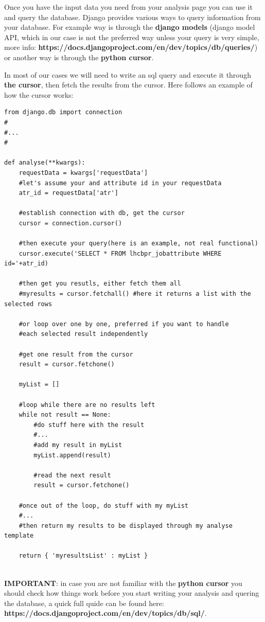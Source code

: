 \documentclass{lhcbnote}
\begin{document}
Once you have the input data you need from your analysis page you can use it and query the database. Django provides various ways to query information from your database. For example way is through the {\bf django models} (django model API, which in our case is not the preferred way unless your query is very simple, more info: {\bf https://docs.djangoproject.com/en/dev/topics/db/queries/}) or another way is through the {\bf python cursor}.

In most of our cases we will need to write an sql query and execute it through {\bf the cursor}, then fetch the results from the cursor. Here follows an example of how the cursor works:

\begin{verbatim}
from django.db import connection
#
#...
#

def analyse(**kwargs):
    requestData = kwargs['requestData']
    #let's assume your and attribute id in your requestData
    atr_id = requestData['atr']
    
    #establish connection with db, get the cursor
    cursor = connection.cursor()
    
    #then execute your query(here is an example, not real functional)
    cursor.execute('SELECT * FROM lhcbpr_jobattribute WHERE id='+atr_id)
    
    #then get you resutls, either fetch them all
    #myresults = cursor.fetchall() #here it returns a list with the selected rows
    
    #or loop over one by one, preferred if you want to handle 
    #each selected result independently 
	
	#get one result from the cursor
    result = cursor.fetchone()
    
	myList = []    
    
    #loop while there are no results left
    while not result == None:
        #do stuff here with the result
		#...
		#add my result in myList
		myList.append(result)        
        
        #read the next result
        result = cursor.fetchone()
    
    #once out of the loop, do stuff with my myList
    #...
    #then return my results to be displayed through my analyse template
    
    return { 'myresultsList' : myList } 
    
\end{verbatim}

{\bf IMPORTANT}: in case you are not familiar with the {\bf python cursor} you should check how things work before you start writing your analysis and quering the database, a quick full quide can be found here: 
{\bf https://docs.djangoproject.com/en/dev/topics/db/sql/}.
\end{document}
